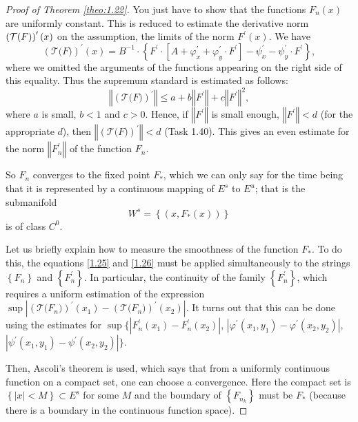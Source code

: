 \begin{proof}[Proof of Theorem \ref{theo:1.22}]
	You just have to show that the functions $ F_ {n} (x) $ are uniformly constant. This is reduced to estimate the derivative norm$\left( \mathcal{%
	T(}F)\right) ^{\prime }(x)$ on the assumption, the limits of the norm $ F ^ {\prime} (x)$. We have 
	\begin{equation}
	\label{1.26}
	\left( \mathcal{T(}F)\right) ^{\prime }(x)=B^{-1}\cdot \left\{ F^{\prime
	}\cdot \left[ A+\varphi _{x}^{\prime }+\varphi _{y}^{\prime }\cdot F^{\prime
	}\right] -\psi _{x}^{\prime }-\psi _{y}^{\prime }\cdot F^{\prime }\right\} ,
	\end{equation}
	where we omitted the arguments of the functions appearing on the right side of this equality. Thus the supremum standard is estimated as follows:
	$$
	\left\Vert \left( \mathcal{T(}F)\right) ^{\prime }\right\Vert \leq
	a+b\left\Vert F^{\prime }\right\Vert +c\left\Vert F^{\prime }\right\Vert
	^{2},
	$$
	where $ a $ is small, $ b <1 $ and $ c> 0. $ Hence, if $\left\Vert F^{\prime }\right\Vert $ is small enough, $\left\Vert
	F^{\prime }\right\Vert <d$ (for the appropriate $ d $), then $\left\Vert \left(\mathcal{T(}F)\right) ^{\prime }\right\Vert <d$ (Task 1.40). This gives an even estimate for the norm $ \left \Vert F_ {n} ^ {\prime} \right \Vert $ of the function $ F_ {n}. $
	
	So $ F_ {n} $ converges to the fixed point $ F _ {\ast}$, which we can only say for the time being that it is represented by a continuous mapping of $ E ^ {s} $ to $ E ^ {u } $; that is the submanifold
	$$
	W^{s}=\left\{ (x,F_{\ast }(x))\right\}
	$$
	is of class $ C ^ {0}. $
	
	Let us briefly explain how to measure the smoothness of the function $ F _ {\ast}$. To do this, the equations \eqref{1.25} and \eqref{1.26} must be applied simultaneously to the strings $ \left \{F_ {n} \right \} $ and $\left \{F_ {n} ^ {\prime} \right \} $. In particular, the continuity of the family $ \left \{F_ {n} ^ {\prime} \right \}$, which requires a uniform estimation of the expression
	$\sup \left\vert \left( \mathcal{T(}	F_{n})\right) ^{\prime }(x_{1})-\left( \mathcal{T(}F_{n})\right) ^{\prime}(x_{2})\right\vert $. It turns out that this can be done using the estimates for 
	$\sup \{\left\vert
	F_{n}^{\prime }(x_{1})-F_{n}^{\prime }(x_{2})\right\vert $, $\left\vert
	\varphi ^{\prime }(x_{1},y_{1})-\varphi ^{\prime }(x_{2},y_{2})\right\vert $, $\left\vert \psi ^{\prime }(x_{1},y_{1})-\psi ^{\prime
	}(x_{2},y_{2})\right\vert \}$.

	Then, Ascoli's theorem is used, which says that from a uniformly continuous function on a compact set, one can choose a convergence. Here the compact set is $\left\{ \left\vert x\right\vert <M\right\} \subset E^{s}$ for some $ M $ and the boundary of $ \left \{F_ {n_ {k}} \right \} $ must be $ F _ {\ast} $ (because there is a boundary in the continuous function space).
		

\end{proof}
